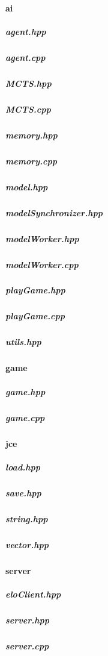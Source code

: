 \documentclass[12pt]{article}
\newcommand{\incFile}[2]{\label{code:#2}\newpage}
\begin{document}
\paragraph{ai}																	%
\subparagraph{agent.hpp}												\incFile{C++}{AlphaZeroPytorch/include/ai/agent.hpp} \label{code:Agent}
\subparagraph{agent.cpp}												\incFile{C++}{AlphaZeroPytorch/include/ai/agent.cpp}
\subparagraph{MCTS.hpp}												\incFile{C++}{AlphaZeroPytorch/include/ai/MCTS.hpp}
\subparagraph{MCTS.cpp}												\incFile{C++}{AlphaZeroPytorch/include/ai/MCTS.cpp}
\subparagraph{memory.hpp}											\incFile{C++}{AlphaZeroPytorch/include/ai/memory.hpp}
\subparagraph{memory.cpp}											\incFile{C++}{AlphaZeroPytorch/include/ai/memory.cpp}
\subparagraph{model.hpp}											\incFile{C++}{AlphaZeroPytorch/include/ai/model.hpp}
\subparagraph{modelSynchronizer.hpp}						\incFile{C++}{AlphaZeroPytorch/include/ai/modelSynchronizer.hpp}
\subparagraph{modelWorker.hpp}								\incFile{C++}{AlphaZeroPytorch/include/ai/modelWorker.hpp}
\subparagraph{modelWorker.cpp}									\incFile{C++}{AlphaZeroPytorch/include/ai/modelWorker.cpp}
\subparagraph{playGame.hpp}										\incFile{C++}{AlphaZeroPytorch/include/ai/playGame.hpp}\label{code:playGame}
\subparagraph{playGame.cpp}										\incFile{C++}{AlphaZeroPytorch/include/ai/playGame.cpp}
\subparagraph{utils.hpp}												\incFile{C++}{AlphaZeroPytorch/include/ai/utils.hpp}
\paragraph{game}															%
\subparagraph{game.hpp}												\incFile{C++}{AlphaZeroPytorch/include/game/game.hpp}\label{code:Game}
\subparagraph{game.cpp}												\incFile{C++}{AlphaZeroPytorch/include/game/game.cpp}
\paragraph{jce}																%
\subparagraph{load.hpp}												\incFile{C++}{AlphaZeroPytorch/include/jce/load.hpp}
\subparagraph{save.hpp}												\incFile{C++}{AlphaZeroPytorch/include/jce/save.hpp}
\subparagraph{string.hpp}												\incFile{C++}{AlphaZeroPytorch/include/jce/string.hpp}
\subparagraph{vector.hpp}											\incFile{C++}{AlphaZeroPytorch/include/jce/vector.hpp}
\paragraph{server}															%
\subparagraph{eloClient.hpp}										\incFile{C++}{AlphaZeroPytorch/include/Server/eloClient.hpp}
\subparagraph{server.hpp}												\incFile{C++}{AlphaZeroPytorch/include/Server/server.hpp}
\subparagraph{server.cpp}												\incFile{C++}{AlphaZeroPytorch/include/Server/server.cpp}
\end{document}

